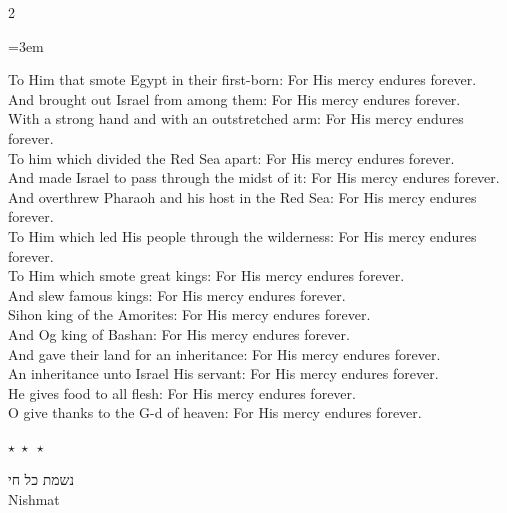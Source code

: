 \documentclass[11pt, openany]{book}
\newcommand{\sederdivider}{%
  \par\vspace{6pt}
  \begin{center}
    \textcolor{sedergold}{\large$\star\;\star\;\star$}
  \end{center}
  \par\vspace{6pt}
}
\newenvironment{bilingual}{%
  \par\vspace{4pt}%
  \begin{paracol}{2}%
}{%
  \end{paracol}%
  \par\vspace{2pt}%
}
\newenvironment{englishcol}{%
  \switchcolumn[0]%
  \begingroup
  \setstretch{1.4}%
  \emergencystretch=3em
  \tolerance=9999
  \normalsize
  \rightskip=0.12in\relax
}{%
  \endgroup
}
\newcommand{\subsedertitle}[2]{%
  \par\vspace{8pt}
  \begin{center}
    {\kidssteptitlefonthebrew\textcolor{sederblue}{\beginR #1\endR}}\\[3pt]
    {\kidssteptitlefont\normalsize\textcolor{sederblue}{#2}}
  \end{center}
  \par\vspace{3pt}
}
\begin{document}
\begin{bilingual}
\begin{englishcol}
To Him that smote Egypt in their first-born: For His mercy endures forever.\\[2pt]
And brought out Israel from among them: For His mercy endures forever.\\[2pt]
With a strong hand and with an outstretched arm: For His mercy endures forever.\\[2pt]
To him which divided the Red Sea apart: For His mercy endures forever.\\[2pt]
And made Israel to pass through the midst of it: For His mercy endures forever.\\[2pt]
And overthrew Pharaoh and his host in the Red Sea: For His mercy endures forever.\\[2pt]
To Him which led His people through the wilderness: For His mercy endures forever.\\[2pt]
To Him which smote great kings: For His mercy endures forever.\\[2pt]
And slew famous kings: For His mercy endures forever.\\[2pt]
Sihon king of the Amorites: For His mercy endures forever.\\[2pt]
And Og king of Bashan: For His mercy endures forever.\\[2pt]
And gave their land for an inheritance: For His mercy endures forever.\\[2pt]
An inheritance unto Israel His servant: For His mercy endures forever.\\[2pt]
He gives food to all flesh: For His mercy endures forever.\\[2pt]
O give thanks to the G-d of heaven: For His mercy endures forever.
\end{englishcol}
\end{bilingual}
\sederdivider

\subsedertitle{נשמת כל חי}{Nishmat}
\end{document}

